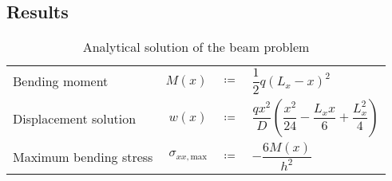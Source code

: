 \subsection{Results}
\begin{table}[h]
	\caption{Analytical solution of the beam problem}
	\begin{center}
		\begin{tabular}{lrcl}
			Bending moment& $M(x)$ & $\coloneqq$ & $\dfrac{1}{2}q(L_x-x)^2$ \\
			Displacement solution& $w(x)$ & $\coloneqq$ & $\dfrac{qx^2}{D}\left( \dfrac{x^2}{24}-\dfrac{L_x x}{6}+\dfrac{L_x^2}{4} \right)$  \\
			Maximum bending stress& $\sigma_{xx,\text{max}}$ & $\coloneqq$ & $-\dfrac{6M(x)}{h^2}$ \\
	\end{tabular}
	\end{center}
	\label{tab:beamSolPar}
\end{table}

\begin{figure}[h]
	\begin{center}
		\setlength\figureheight{8cm} 
		\setlength{} 
		
	\end{center}
	\label{fig:BeamDisp}
\end{figure}
\begin{figure}[h]
	\begin{center}
		\setlength\figureheight{8cm} 
		\setlength{} 
		
	\end{center}
	\label{fig:BeamStress}
\end{figure}
